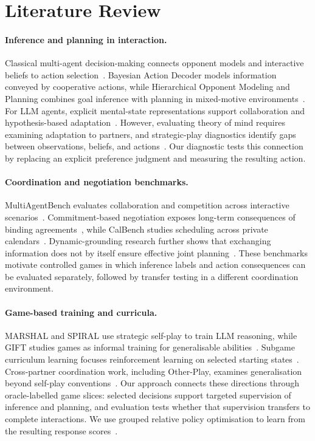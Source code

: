 \documentclass[11pt,a4paper]{article}
\begin{document}
\section{Literature Review}
\paragraph{Inference and planning in interaction.}
Classical multi-agent decision-making connects opponent models and
interactive beliefs to action selection~\cite{carmel1996opponent,gmytrasiewicz2005ipomdp}.
Bayesian Action Decoder models information conveyed by cooperative actions,
while Hierarchical Opponent Modeling and Planning combines goal inference
with planning in mixed-motive environments~\cite{foerster2019bad,huang2024hop}.
For LLM agents, explicit mental-state representations support collaboration
and hypothesis-based adaptation~\cite{li2023theory,cross2025hypothetical}.
However, evaluating theory of mind requires examining adaptation to
partners, and strategic-play diagnostics identify gaps between observations,
beliefs, and actions~\cite{riemer2025tom,sobotka2026strategic}.
Our diagnostic tests this connection by replacing an explicit preference
judgment and measuring the resulting action.

\paragraph{Coordination and negotiation benchmarks.}
MultiAgentBench evaluates collaboration and competition across interactive
scenarios~\cite{zhu2025multiagentbench}. Commitment-based negotiation exposes
long-term consequences of binding agreements~\cite{benac2026benchmark},
while CalBench studies scheduling across private calendars~\cite{zou2026calbench}.
Dynamic-grounding research further shows that exchanging information does
not by itself ensure effective joint planning~\cite{yao2026talk}.
These benchmarks motivate controlled games in which inference labels and
action consequences can be evaluated separately, followed by transfer
testing in a different coordination environment.

\paragraph{Game-based training and curricula.}
MARSHAL and SPIRAL use strategic self-play to train LLM reasoning,
while GIFT studies games as informal training for generalisable
abilities~\cite{yuan2026marshal,liu2026spiral,lyu2026gift}.
Subgame curriculum learning focuses reinforcement learning on selected
starting states~\cite{chen2024subgame}. Cross-partner coordination work,
including Other-Play, examines generalisation beyond self-play
conventions~\cite{hu2020otherplay}.
Our approach connects these directions through oracle-labelled game slices:
selected decisions support targeted supervision of inference and planning,
and evaluation tests whether that supervision transfers to complete
interactions. We use grouped relative policy optimisation to learn from
the resulting response scores~\cite{shao2024deepseekmath}.
\end{document}
